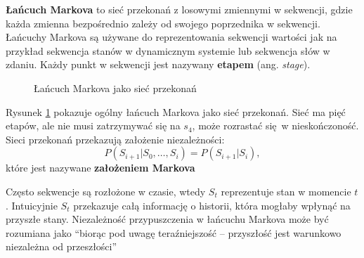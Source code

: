 \documentclass[a4paper, 12pt,oneside]{book}
\begin{document}
\textbf{Łańcuch Markova} to sieć przekonań z losowymi zmiennymi w sekwencji,
gdzie każda zmienna bezpośrednio zależy od swojego poprzednika w sekwencji.
Łańcuchy Markova są używane do reprezentowania sekwencji wartości jak
na przykład sekwencja stanów w dynamicznym systemie lub sekwencja słów w
zdaniu. Każdy punkt w sekwencji jest nazywany \textbf{etapem} (ang.
\textit{stage}).
\begin{figure}[!htb]
\begin{center}
\caption{Łańcuch Markova jako sieć przekonań}
\label{markov_chain}
\end{center}
\end{figure}
Rysunek \ref{markov_chain} pokazuje ogólny łańcuch Markova jako sieć przekonań.
Sieć ma pięć etapów, ale nie musi zatrzymywać się na $s_4$, może rozrastać
się w nieskończoność. Sieci przekonań przekazują założenie niezależności:
\[P(S_{i+1} | S_0, \dots , S_i) = P(S_{i+1} | S_i),\]
które jest nazywane \textbf{założeniem Markova}

Często sekwencje są rozłożone w czasie, wtedy $S_t$ reprezentuje stan w
momencie $t$. Intuicyjnie $S_t$ przekazuje całą informację o historii, która
mogłaby wpłynąć na przyszłe stany. Niezależność przypuszczenia w łańcuchu
Markova może być rozumiana jako ``biorąc pod uwagę teraźniejszość -- przyszłość
jest warunkowo niezależna od przeszłości''
\end{document}
